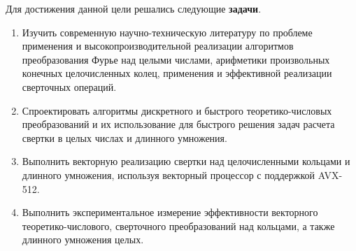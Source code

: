 Для достижения данной цели решались следующие \textbf{задачи}.
\begin{enumerate}[wide]
\item Изучить современную научно-техническую литературу по проблеме применения и высокопроизводительной реализации алгоритмов преобразования Фурье над целыми числами, арифметики произвольных конечных целочисленных колец, применения и эффективной реализации сверточных операций.
\item Спроектировать алгоритмы дискретного и быстрого теоретико-числовых преобразований и их использование для быстрого решения задач расчета свертки в целых числах и длинного умножения.
\item Выполнить векторную реализацию свертки над целочисленными кольцами и длинного умножения, используя векторный процессор с поддержкой AVX-512.
\item Выполнить экспериментальное измерение эффективности векторного теоретико-числового, сверточного преобразований над кольцами, а также длинного умножения целых.
\end{enumerate}

